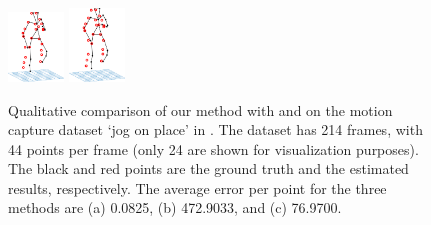 \begin{figure}[t]
{\includegraphics[width=0.132\textwidth]{chapter5/resource/compare_with_prior_free/filtermethod/0091.pdf}
\includegraphics[width=0.132\textwidth]{chapter5/resource/compare_with_prior_free/filtermethod/0110.pdf}
\label{fig:trajectory_Qualitative_result}
}
\caption{Qualitative comparison of our method with \cite{dai2014simple} and \cite{Valmadre_CVPR2012} on the motion capture dataset `jog on place' in \cite{cg-2007-2}. The dataset has 214 frames, with 44 points per frame (only 24 are shown for visualization purposes). The black and red points are the ground truth and the estimated results, respectively. The average error per point for the three methods are (a) 0.0825, (b) 472.9033, and (c) 76.9700.}
\end{figure}

